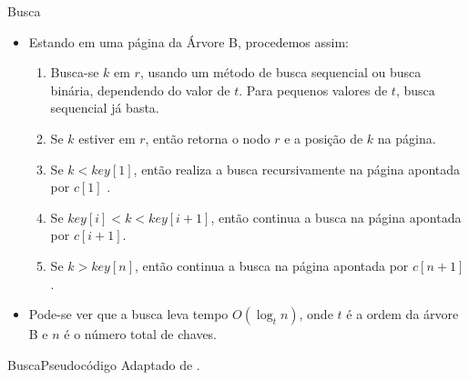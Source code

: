 \documentclass[aspectratio=169]{beamer}
\begin{document}
{\begin{frame}{Busca}
\begin{itemize}
 \item Estando em uma página da Árvore B, procedemos assim:
\begin{enumerate}
\item Busca-se $k$ em $r$, usando um método de busca sequencial ou busca binária, dependendo do valor de $t$. Para pequenos valores de $t$, busca sequencial já basta.
\item Se $k$ estiver em $r$, então retorna o nodo $r$ e a posição de $k$ na página.
\item Se $k < key[1]$, então realiza a busca recursivamente na página apontada por $c[1]$ .
\item Se $key[i] < k < key[i+1]$, então continua a busca na página apontada por $c[i+1]$.
\item Se $k > key[n]$, então continua a busca na página apontada por $c[n+1]$.
\end{enumerate}
\item Pode-se ver que a busca leva tempo $O(\log_t n)$, onde $t$ é a ordem da árvore B e $n$ é o número total de chaves.
\end{itemize}
\end{frame}


\begin{frame}{Busca}{Pseudocódigo}
\tiny{Adaptado de \cite{Cormen2012}}.
\end{frame}


}
\end{document}
